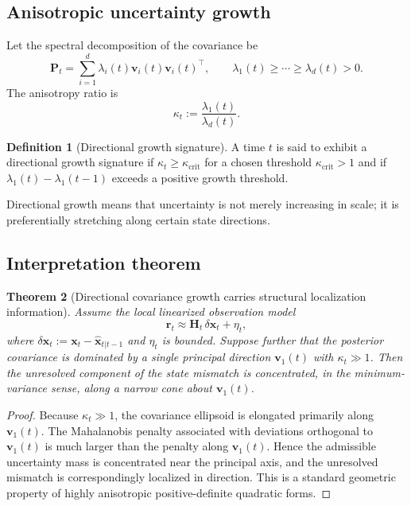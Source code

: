 \documentclass[11pt,letterpaper]{article}
\newcommand{\state}{\mathbf{x}}
\newcommand{\resid}{\mathbf{r}}
\newcommand{\covar}{\mathbf{P}}
\newcommand{\Jac}{\mathbf{H}}
\theoremstyle{gcresult}
\newtheorem{theorem}{Theorem}[section]
\theoremstyle{definition}
\newtheorem{definition}[theorem]{Definition}
\begin{document}
\subsection{Anisotropic uncertainty growth}
Let the spectral decomposition of the covariance be
\begin{equation}
    \covar_t = \sum_{i=1}^{d} \lambda_i(t) \mathbf{v}_i(t) \mathbf{v}_i(t)^\top,
    \qquad \lambda_1(t) \ge \cdots \ge \lambda_d(t) > 0.
\end{equation}
The anisotropy ratio is
\begin{equation}
    \kappa_t := \frac{\lambda_1(t)}{\lambda_d(t)}.
\end{equation}

\begin{definition}[Directional growth signature]
A time $t$ is said to exhibit a directional growth signature if $\kappa_t \ge \kappa_{\mathrm{crit}}$ for a chosen threshold $\kappa_{\mathrm{crit}} > 1$ and if $\lambda_1(t)-\lambda_1(t-1)$ exceeds a positive growth threshold.
\end{definition}

Directional growth means that uncertainty is not merely increasing in scale; it is preferentially stretching along certain state directions.

\subsection{Interpretation theorem}
\begin{theorem}[Directional covariance growth carries structural localization information]
Assume the local linearized observation model
\begin{equation}
    \resid_t \approx \Jac_t \, \delta\state_t + \eta_t,
\end{equation}
where $\delta\state_t := \state_t - \hat{\state}_{t|t-1}$ and $\eta_t$ is bounded. Suppose further that the posterior covariance is dominated by a single principal direction $\mathbf{v}_1(t)$ with $\kappa_t \gg 1$. Then the unresolved component of the state mismatch is concentrated, in the minimum-variance sense, along a narrow cone about $\mathbf{v}_1(t)$.
\end{theorem}

\begin{proof}
Because $\kappa_t \gg 1$, the covariance ellipsoid is elongated primarily along $\mathbf{v}_1(t)$. The Mahalanobis penalty associated with deviations orthogonal to $\mathbf{v}_1(t)$ is much larger than the penalty along $\mathbf{v}_1(t)$. Hence the admissible uncertainty mass is concentrated near the principal axis, and the unresolved mismatch is correspondingly localized in direction. This is a standard geometric property of highly anisotropic positive-definite quadratic forms.
\end{proof}
\end{document}

